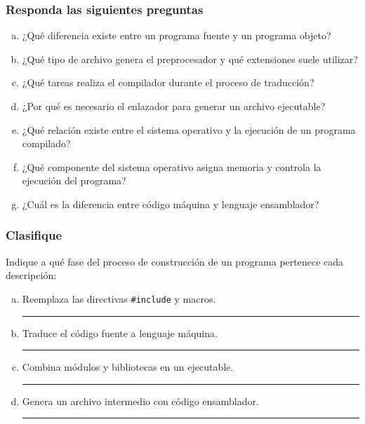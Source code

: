 \subsubsection{Responda las siguientes preguntas}
\begin{enumerate}[a)]
  \item ¿Qué diferencia existe entre un programa fuente y un programa objeto?
  \item ¿Qué tipo de archivo genera el preprocesador y qué extensiones suele utilizar?
  \item ¿Qué tareas realiza el compilador durante el proceso de traducción?
  \item ¿Por qué es necesario el enlazador para generar un archivo ejecutable?
  \item ¿Qué relación existe entre el sistema operativo y la ejecución de un programa compilado?
  \item ¿Qué componente del sistema operativo asigna memoria y controla la ejecución del programa?
  \item ¿Cuál es la diferencia entre código máquina y lenguaje ensamblador?
\end{enumerate}

\subsubsection{Clasifique}
Indique a qué fase del proceso de construcción de un programa pertenece cada descripción:
\begin{enumerate}[a)]
  \item Reemplaza las directivas \texttt{\#include} y macros. \hfill \rule{4cm}{0.1pt}
  \item Traduce el código fuente a lenguaje máquina. \hfill \rule{4cm}{0.1pt}
  \item Combina módulos y bibliotecas en un ejecutable. \hfill \rule{4cm}{0.1pt}
  \item Genera un archivo intermedio con código ensamblador. \hfill \rule{4cm}{0.1pt}
\end{enumerate}

